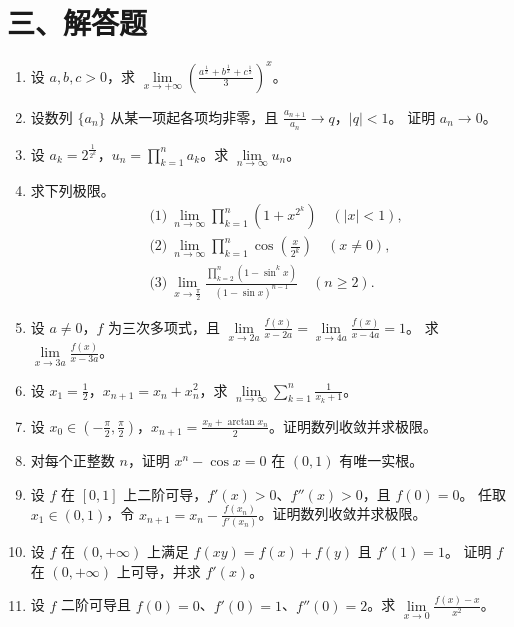 \documentclass[UTF8,a4paper,zihao=-4,fontset=fandol]{ctexart}
\renewcommand{\lim}{\operatorname*{lim}\limits}
\begin{document}
\section*{三、解答题}
\begin{enumerate}[start=50]
\item 设 $a,b,c>0$，求 $\displaystyle\lim_{x\to+\infty}
\left(\frac{a^{\frac{1}{x}}+b^{\frac{1}{x}}+c^{\frac{1}{x}}}3\right)^x$。
\item 设数列 $\{a_n\}$ 从某一项起各项均非零，且 $\frac{a_{n+1}}{a_n}\to q$，$|q|<1$。
证明 $a_n\to0$。
\item 设 $a_k=2^{\frac{1}{2^k}}$，$u_n=\prod_{k=1}^n a_k$。求 $\lim_{n\to\infty}u_n$。
\item 求下列极限。
\[
\begin{aligned}
  &\text{(1)}\ \lim_{n\to\infty}\prod_{k=1}^n(1+x^{2^k})\quad (|x|<1),\\
  &\text{(2)}\ \lim_{n\to\infty}\prod_{k=1}^n\cos(\frac{x}{2^k})\quad (x\ne0),\\
  &\text{(3)}\ \lim_{x\to\frac{\pi}{2}}\frac{\prod_{k=2}^{n}(1-\sin^k x)}
    {(1-\sin x)^{n-1}}\quad (n\ge2).
\end{aligned}
\]
\item 设 $a\ne0$，$f$ 为三次多项式，且
$\displaystyle\lim_{x\to2a}\frac{f(x)}{x-2a}=\lim_{x\to4a}\frac{f(x)}{x-4a}=1$。
求 $\displaystyle\lim_{x\to3a}\frac{f(x)}{x-3a}$。
\item 设 $x_1=\frac{1}{2}$，$x_{n+1}=x_n+x_n^2$，求 $\displaystyle\lim_{n\to\infty}\sum_{k=1}^n\frac1{x_k+1}$。
\item 设 $x_0\in(-\frac{\pi}{2},\frac{\pi}{2})$，$x_{n+1}=\frac{x_n+\arctan x_n}{2}$。证明数列收敛并求极限。
\item 对每个正整数 $n$，证明 $x^n-\cos x=0$ 在 $(0,1)$ 有唯一实根。
\item 设 $f$ 在 $[0,1]$ 上二阶可导，$f'(x)>0$、$f''(x)>0$，且 $f(0)=0$。
任取 $x_1\in(0,1)$，令 $x_{n+1}=x_n-\frac{f(x_n)}{f'(x_n)}$。证明数列收敛并求极限。
\item 设 $f$ 在 $(0,+\infty)$ 上满足 $f(xy)=f(x)+f(y)$ 且 $f'(1)=1$。
证明 $f$ 在 $(0,+\infty)$ 上可导，并求 $f'(x)$。
\item 设 $f$ 二阶可导且 $f(0)=0$、$f'(0)=1$、$f''(0)=2$。求
$\displaystyle\lim_{x\to0}\frac{f(x)-x}{x^2}$。

\end{enumerate}
\end{document}
